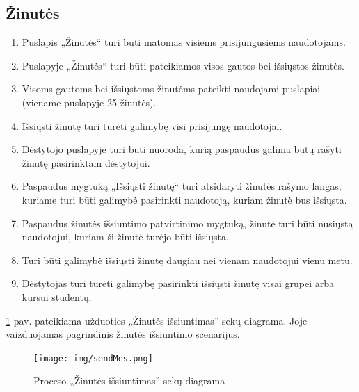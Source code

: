 \documentclass{VUMIFPSkursinis}
\begin{document}
\subsection{Žinutės}
\begin{enumerate}[label=FR10.\arabic*] 
	\item Puslapis „Žinutės“ turi būti matomas visiems prisijungusiems naudotojams.
	\item Puslapyje „Žinutės“ turi būti pateikiamos visos gautos bei išsiųstos žinutės.
	\item Visoms gautoms bei išsiųstoms žinutėms pateikti naudojami puslapiai (viename puslapyje 25 žinutės).
	\item Išsiųsti žinutę turi turėti galimybę visi prisijungę naudotojai.
	\item Dėstytojo puslapyje turi buti nuoroda, kurią paspaudus galima būtų rašyti žinutę pasirinktam dėstytojui.
	\item Paspaudus mygtuką „Išsiųsti žinutę“ turi atsidaryti žinutės rašymo langas, kuriame turi būti galimybė pasirinkti naudotoją, kuriam žinutė bus išsiųsta.
	\item Paspaudus žinutės išsiuntimo patvirtinimo mygtuką, žinutė turi būti nusiųstą naudotojui, kuriam ši žinutė turėjo būti išsiųsta.
	\item Turi būti galimybė išsiųsti žinutę daugiau nei vienam naudotojui vienu metu.
	\item Dėstytojas turi turėti galimybę pasirinkti išsiųsti žinutę visai grupei arba kursui studentų.\newline
\end{enumerate}

\ref{fig:sendmessage} pav. pateikiama užduoties „Žinutės išsiuntimas” sekų diagrama. Joje vaizduojamas pagrindinis žinutės išsiuntimo scenarijus.
\begin{figure}[H]
	\centering
	\texttt{[image: img/sendMes.png]}
	\caption{Proceso „Žinutės išsiuntimas” sekų diagrama}
	\label{fig:sendmessage}
\end{figure}
\end{document}
